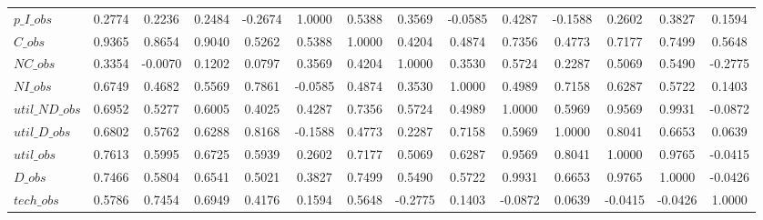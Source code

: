 \begin{center}
\begin{longtable}{lccccccccccccc}
$p\_I\_obs      $	 & 	           0.2774	 & 	           0.2236	 & 	           0.2484	 & 	          -0.2674	 & 	           1.0000	 & 	           0.5388	 & 	           0.3569	 & 	          -0.0585	 & 	           0.4287	 & 	          -0.1588	 & 	           0.2602	 & 	           0.3827	 & 	           0.1594 \\ 
$C\_obs         $	 & 	           0.9365	 & 	           0.8654	 & 	           0.9040	 & 	           0.5262	 & 	           0.5388	 & 	           1.0000	 & 	           0.4204	 & 	           0.4874	 & 	           0.7356	 & 	           0.4773	 & 	           0.7177	 & 	           0.7499	 & 	           0.5648 \\ 
$NC\_obs        $	 & 	           0.3354	 & 	          -0.0070	 & 	           0.1202	 & 	           0.0797	 & 	           0.3569	 & 	           0.4204	 & 	           1.0000	 & 	           0.3530	 & 	           0.5724	 & 	           0.2287	 & 	           0.5069	 & 	           0.5490	 & 	          -0.2775 \\ 
$NI\_obs        $	 & 	           0.6749	 & 	           0.4682	 & 	           0.5569	 & 	           0.7861	 & 	          -0.0585	 & 	           0.4874	 & 	           0.3530	 & 	           1.0000	 & 	           0.4989	 & 	           0.7158	 & 	           0.6287	 & 	           0.5722	 & 	           0.1403 \\ 
$util\_ND\_obs  $	 & 	           0.6952	 & 	           0.5277	 & 	           0.6005	 & 	           0.4025	 & 	           0.4287	 & 	           0.7356	 & 	           0.5724	 & 	           0.4989	 & 	           1.0000	 & 	           0.5969	 & 	           0.9569	 & 	           0.9931	 & 	          -0.0872 \\ 
$util\_D\_obs   $	 & 	           0.6802	 & 	           0.5762	 & 	           0.6288	 & 	           0.8168	 & 	          -0.1588	 & 	           0.4773	 & 	           0.2287	 & 	           0.7158	 & 	           0.5969	 & 	           1.0000	 & 	           0.8041	 & 	           0.6653	 & 	           0.0639 \\ 
$util\_obs      $	 & 	           0.7613	 & 	           0.5995	 & 	           0.6725	 & 	           0.5939	 & 	           0.2602	 & 	           0.7177	 & 	           0.5069	 & 	           0.6287	 & 	           0.9569	 & 	           0.8041	 & 	           1.0000	 & 	           0.9765	 & 	          -0.0415 \\ 
$D\_obs         $	 & 	           0.7466	 & 	           0.5804	 & 	           0.6541	 & 	           0.5021	 & 	           0.3827	 & 	           0.7499	 & 	           0.5490	 & 	           0.5722	 & 	           0.9931	 & 	           0.6653	 & 	           0.9765	 & 	           1.0000	 & 	          -0.0426 \\ 
$tech\_obs      $	 & 	           0.5786	 & 	           0.7454	 & 	           0.6949	 & 	           0.4176	 & 	           0.1594	 & 	           0.5648	 & 	          -0.2775	 & 	           0.1403	 & 	          -0.0872	 & 	           0.0639	 & 	          -0.0415	 & 	          -0.0426	 & 	           1.0000 \\ 
\end{longtable}
 \end{center}
